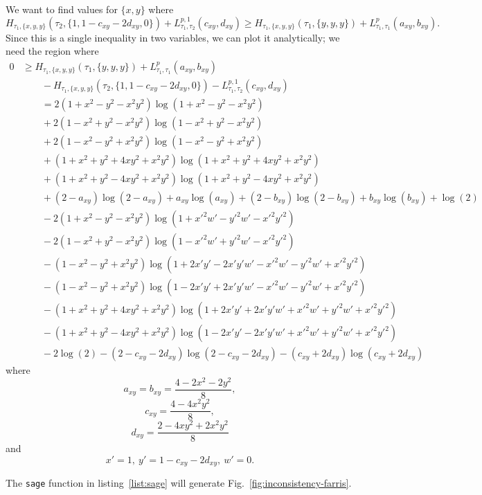 \documentclass[a4paper]{article}
\begin{document}
We want to find values for $\{x,y\}$ where
$$
H_{\tau_1,\{x,y,y\}}(\tau_2,\{1, 1-c_{xy}-2d_{xy}, 0\}) + L^{p,1}_{\tau_1,\tau_2}(c_{xy},d_{xy}) \ge H_{\tau_1,\{x,y,y\}}(\tau_1,\{y, y, y\}) + L^{p}_{\tau_1,\tau_1}(a_{xy},b_{xy}).
$$
Since this is a single inequality in two variables, we can plot it analytically; we need the region where
\begin{align*}
    0 &\ge H_{\tau_1,\{x,y,y\}}(\tau_1,\{y, y, y\}) + L^{p}_{\tau_1,\tau_1}(a_{xy},b_{xy}) \\
      &\qquad - H_{\tau_1,\{x,y,y\}}(\tau_2,\{1, 1-c_{xy}-2d_{xy}, 0\}) - L^{p,1}_{\tau_1,\tau_2}(c_{xy},d_{xy}) \\
%
      &\qquad = 2(1+x^2-y^2-x^2y^2)\log(1+x^2-y^2-x^2y^2) \\
      &\qquad + 2(1-x^2+y^2-x^2y^2)\log(1-x^2+y^2-x^2y^2) \\
      &\qquad + 2(1-x^2-y^2+x^2y^2)\log(1-x^2-y^2+x^2y^2) \\
      &\qquad + (1+x^2+y^2+4xy^2+x^2y^2)\log(1+x^2+y^2+4xy^2+x^2y^2) \\
      &\qquad + (1+x^2+y^2-4xy^2+x^2y^2)\log(1+x^2+y^2-4xy^2+x^2y^2) \\
%
      &\qquad + (2-a_{xy})\log(2-a_{xy})+a_{xy}\log(a_{xy})+(2-b_{xy})\log(2-b_{xy})+b_{xy}\log(b_{xy})+\log(2) \\
%
      &\qquad - 2(1+x^2-y^2-x^2y^2)\log(1+x'^2w'-y'^2w'-x'^2y'^2) \\
      &\qquad - 2(1-x^2+y^2-x^2y^2)\log(1-x'^2w'+y'^2w'-x'^2y'^2) \\
      &\qquad - (1-x^2-y^2+x^2y^2)\log(1+2x'y'-2x'y'w'-x'^2w'-y'^2w'+x'^2y'^2) \\
      &\qquad - (1-x^2-y^2+x^2y^2)\log(1-2x'y'+2x'y'w'-x'^2w'-y'^2w'+x'^2y'^2) \\
      &\qquad - (1+x^2+y^2+4xy^2+x^2y^2)\log(1+2x'y'+2x'y'w'+x'^2w'+y'^2w'+x'^2y'^2) \\
      &\qquad - (1+x^2+y^2-4xy^2+x^2y^2)\log(1-2x'y'-2x'y'w'+x'^2w'+y'^2w'+x'^2y'^2) \\
%
      &\qquad - 2\log(2)-(2-c_{xy}-2d_{xy})\log(2-c_{xy}-2d_{xy})-(c_{xy}+2d_{xy})\log(c_{xy}+2d_{xy})
\end{align*}
where
$$
a_{xy} = b_{xy} = \frac{4-2x^2-2y^2}{8},
$$
$$
c_{xy} = \frac{4-4x^2y^2}{8},
$$
$$
d_{xy} = \frac{2-4xy^2+2x^2y^2}{8}
$$
and
$$
x' = 1, \ y' = 1-c_{xy}-2d_{xy}, \ w' = 0.
$$

The \texttt{sage} function in listing~\ref{list:sage} will generate Fig.~\ref{fig:inconsistency-farris}.
\end{document}
